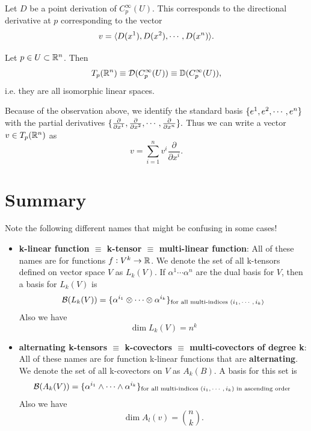 \begin{observation}
	Let $ D $ be a point derivation of $ C_p^\infty (U) $. This corresponds to the directional derivative at $ p $ corresponding to the vector 
	\[ v = \langle D(x^1), D(x^2), \cdots, D(x^n) \rangle. \]
\end{observation}

\begin{observation}
	Let $ p \in U \subset \mathbb{R}^n $. Then 
	\[ T_p(\mathbb{R}^n) \equiv \mathcal{D}(C_p^\infty(U)) \equiv \mathbb{D}(C_p^\infty(U)), \]
	i.e. they are all isomorphic linear spaces.
\end{observation}

Because of the observation above, we identify the standard basis $ \{e^1, e^2, \cdots, e^n\} $ with the partial derivatives $ \{\frac{\partial}{\partial x^1}, \frac{\partial}{\partial x^2}, \cdots,\frac{\partial}{\partial x^n}\}. $ Thus we can write a vector $ v \in T_p(\mathbb{R}^n) $ as 
\[ v = \sum_{i=1}^{n} v^i \frac{\partial}{\partial x^i}. \]


\section{Summary}


\begin{summary}
	Note the following different names that might be confusing in some cases!
	\begin{itemize}
		\item \textbf{k-linear function $ \equiv $ k-tensor $ \equiv $ multi-linear function}: All of these names are for functions $ f: V^k \to \mathbb{R} $. We denote the set of all k-tensors defined on vector space $ V $ as $ L_k(V) $. If $ \alpha^1 \cdots \alpha^n $ are the dual basis for $ V $, then a basis for $ L_k(V) $ is
		\[ \mathcal{B}(L_k(V)) = \{\alpha^{i_1} \otimes \cdots \otimes \alpha^{i_k}\}_\text{for all multi-indices $ (i_1,\cdots,i_k) $} \]
		Also we have
		\[ \dim L_k(V) = n^k \]
		\item \textbf{alternating k-tensors $ \equiv $ k-covectors $ \equiv $ multi-covectors of degree k}: All of these names are for function k-linear functions that are \textbf{alternating}. We denote the set of all k-covectors on $ V $ as $ A_k(B) $. A basis for this set is
		\[ \mathcal{B}(A_k(V)) = \{\alpha^{i_1}\wedge \cdots \wedge \alpha^{i_k}\}_{\text{for all multi-indices $ (i_1,\cdots,i_k) $ in ascending order }} \]
		Also we have
		\[ \dim A_l(v) = \binom{n}{k}. \]
	\end{itemize}
\end{summary}

